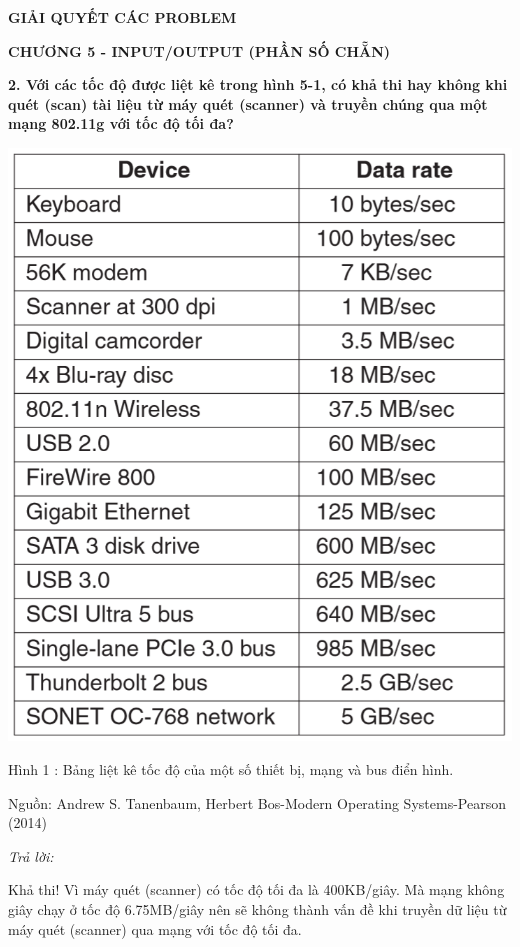 \documentclass{report}
\begin{document}
\newpage
\changefontsizes{16pt}
\centerline{\textbf{GIẢI QUYẾT CÁC PROBLEM}}
\centerline{\textbf{CHƯƠNG 5 - INPUT/OUTPUT (PHẦN SỐ CHẴN)}}

\bigskip
\setlength{\parindent}{0.0cm}
\changefontsizes{13pt}
\textbf{2. Với các tốc độ được liệt kê trong hình 5-1, có khả thi hay không khi quét (scan) tài liệu từ máy quét (scanner) và truyền chúng qua một mạng 802.11g với tốc độ tối đa?}

\begin{center}
     \includegraphics[scale=0.7]{hinh1}
\end{center}

\centerline{Hình 1 : Bảng liệt kê tốc độ của một số thiết bị, mạng và bus điển hình.}
\changefontsizes{12pt}
\centerline{Nguồn: Andrew S. Tanenbaum, Herbert Bos-Modern Operating Systems-Pearson (2014)}
\changefontsizes{13pt}

\bigskip
\textit{Trả lời:}

\smallskip
Khả thi! Vì máy quét (scanner) có tốc độ tối đa là 400KB/giây. Mà mạng không giây chạy ở tốc độ 6.75MB/giây nên sẽ không thành vấn đề khi truyền dữ liệu từ máy quét (scanner) qua mạng với tốc độ tối đa.
\end{document}
